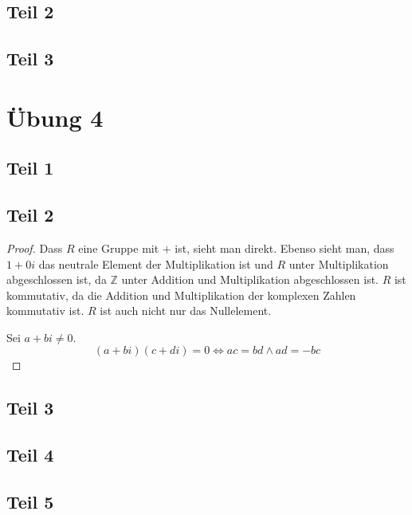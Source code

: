 \documentclass[10pt,a4paper]{article}
\begin{document}
\subsection{Teil 2}

\subsection{Teil 3}

\section{Übung 4}

\subsection{Teil 1}

\subsection{Teil 2}

\begin{proof}
  Dass $R$ eine Gruppe mit $+$ ist, sieht man direkt.
  Ebenso sieht man, dass $1 + 0i$ das neutrale Element der Multiplikation ist und $R$ unter Multiplikation abgeschlossen ist, da $\mathbb{Z}$ unter Addition und Multiplikation abgeschlossen ist.
  $R$ ist kommutativ, da die Addition und Multiplikation der komplexen Zahlen kommutativ ist.
  $R$ ist auch nicht nur das Nullelement.

  Sei $a + bi \ne 0$.
  \begin{equation}
    (a + bi)(c + di) = 0 \Leftrightarrow ac = bd \land ad = -bc
  \end{equation}
\end{proof}

\subsection{Teil 3}

\subsection{Teil 4}

\subsection{Teil 5}
\end{document}
